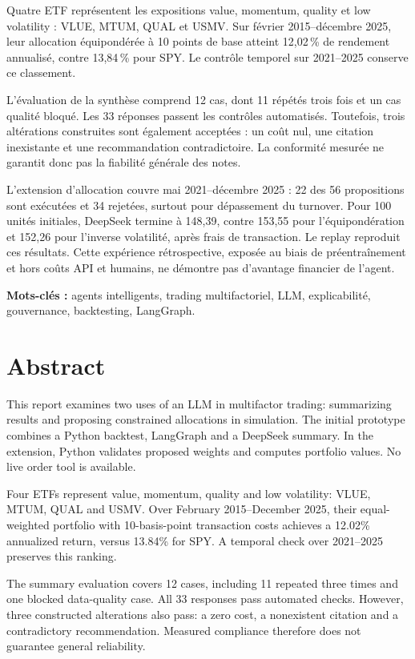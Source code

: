 \documentclass[12pt,letterpaper]{report}
\begin{document}
Quatre ETF représentent les expositions value, momentum, quality et low volatility : VLUE, MTUM, QUAL et USMV. Sur février 2015--décembre 2025, leur allocation équipondérée à 10 points de base atteint 12,02\,\% de rendement annualisé, contre 13,84\,\% pour SPY. Le contrôle temporel sur 2021--2025 conserve ce classement.

L'évaluation de la synthèse comprend 12 cas, dont 11 répétés trois fois et un cas qualité bloqué. Les 33 réponses passent les contrôles automatisés. Toutefois, trois altérations construites sont également acceptées : un coût nul, une citation inexistante et une recommandation contradictoire. La conformité mesurée ne garantit donc pas la fiabilité générale des notes.

L'extension d'allocation couvre mai 2021--décembre 2025 : 22 des 56 propositions sont exécutées et 34 rejetées, surtout pour dépassement du turnover. Pour 100 unités initiales, DeepSeek termine à 148,39, contre 153,55 pour l'équipondération et 152,26 pour l'inverse volatilité, après frais de transaction. Le replay reproduit ces résultats. Cette expérience rétrospective, exposée au biais de préentraînement et hors coûts API et humains, ne démontre pas d'avantage financier de l'agent.

\vspace{0.4cm}
\noindent \textbf{Mots-clés :} agents intelligents, trading multifactoriel, LLM, explicabilité, gouvernance, backtesting, LangGraph.

\clearpage
\chapter*{Abstract}
This report examines two uses of an LLM in multifactor trading: summarizing results and proposing constrained allocations in simulation. The initial prototype combines a Python backtest, LangGraph and a DeepSeek summary. In the extension, Python validates proposed weights and computes portfolio values. No live order tool is available.

Four ETFs represent value, momentum, quality and low volatility: VLUE, MTUM, QUAL and USMV. Over February 2015--December 2025, their equal-weighted portfolio with 10-basis-point transaction costs achieves a 12.02\% annualized return, versus 13.84\% for SPY. A temporal check over 2021--2025 preserves this ranking.

The summary evaluation covers 12 cases, including 11 repeated three times and one blocked data-quality case. All 33 responses pass automated checks. However, three constructed alterations also pass: a zero cost, a nonexistent citation and a contradictory recommendation. Measured compliance therefore does not guarantee general reliability.
\end{document}
